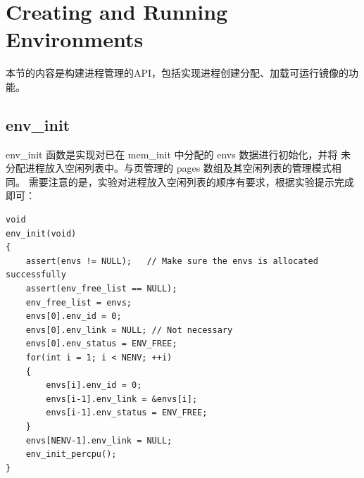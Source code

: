 \documentclass[12pt, letterpaper]{report}
\begin{document}
\newpage
\section[\large Creating and Running Environments]{Creating and Running Environments}

本节的内容是构建进程管理的API，包括实现进程创建分配、加载可运行镜像的功能。\par 


\subsection{\large env\_init}
env\_init 函数是实现对已在 mem\_init 中分配的 envs 数据进行初始化，并将
未分配进程放入空闲列表中。与页管理的 pages 数组及其空闲列表的管理模式相同。
需要注意的是，实验对进程放入空闲列表的顺序有要求，根据实验提示完成即可：\par 

\lstset{style=CStyle}
\setmainfont{Consolas}
\begin{lstlisting}
void
env_init(void)
{
    assert(envs != NULL);	// Make sure the envs is allocated successfully
    assert(env_free_list == NULL);
    env_free_list = envs;
    envs[0].env_id = 0;
    envs[0].env_link = NULL; // Not necessary
    envs[0].env_status = ENV_FREE;
    for(int i = 1; i < NENV; ++i)
    {
        envs[i].env_id = 0;
        envs[i-1].env_link = &envs[i];
        envs[i-1].env_status = ENV_FREE;
    }
    envs[NENV-1].env_link = NULL;
    env_init_percpu();
}
\end{lstlisting}
\setmainfont{Times New Roman}
\end{document}
